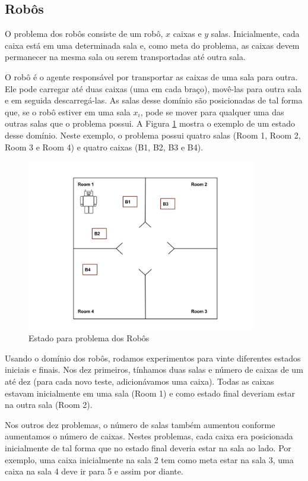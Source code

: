\subsection{Robôs}\label{problemas:robos}

O problema dos robôs consiste de um robô, $x$ caixas e $y$ salas. Inicialmente, cada caixa está em uma determinada sala e, como meta do problema, as caixas devem permanecer na mesma sala ou serem transportadas até outra sala.

O robô é o agente responsável por transportar as caixas de uma sala para outra. Ele pode carregar até duas caixas (uma em cada braço), movê-las para outra sala e em seguida descarregá-las. As salas desse domínio são posicionadas de tal forma que, se o robô estiver em uma sala $x_i$, pode se mover para qualquer uma das outras salas que o problema possui. A Figura \ref{fig:salas} mostra o exemplo de um estado desse domínio. Neste exemplo, o problema possui quatro salas (Room 1, Room 2, Room 3 e Room 4) e quatro caixas (B1, B2, B3 e B4).

\begin{figure}[H]%
  \centering
  \includegraphics[width=10cm]{figures/salas.png}
  \caption{Estado para problema dos Robôs}
  \label{fig:salas}
\end{figure}

Usando o domínio dos robôs, rodamos experimentos para vinte diferentes estados iniciais e finais. Nos dez primeiros, tínhamos duas salas e número de caixas de um até dez (para cada novo teste, adicionávamos uma caixa). Todas as caixas estavam inicialmente em uma sala (Room 1) e como estado final deveriam estar na outra sala (Room 2).

Nos outros dez problemas, o número de salas também aumentou conforme aumentamos o número de caixas. Nestes problemas, cada caixa era posicionada inicialmente de tal forma que no estado final deveria estar na sala ao lado. Por exemplo, uma caixa inicialmente na sala 2 tem como meta estar na sala 3, uma caixa na sala 4 deve ir para 5 e assim por diante.

